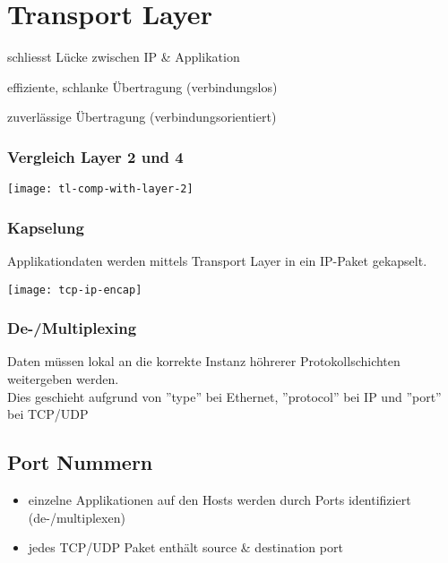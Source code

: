 \section{Transport Layer}

\begin{description}
    \item schliesst Lücke zwischen IP \& Applikation
    \item[UDP] effiziente, schlanke Übertragung (verbindungslos)
    \item[TCP] zuverlässige Übertragung (verbindungsorientiert)
\end{description}

\subsubsection{Vergleich Layer 2 und 4}
\begin{center}
    \texttt{[image: tl-comp-with-layer-2]}
\end{center}

\subsubsection{Kapselung}

Applikationdaten werden mittels Transport Layer in ein IP-Paket gekapselt.

\texttt{[image: tcp-ip-encap]}



\subsubsection{De-/Multiplexing}

Daten müssen lokal an die korrekte Instanz höhrerer Protokollschichten
weitergeben werden. \\

Dies geschieht aufgrund von ''type'' bei Ethernet, ''protocol'' bei IP
und ''port'' bei TCP/UDP



\subsection{Port Nummern}

\begin{itemize}
    \item einzelne Applikationen auf den Hosts werden durch Ports identifiziert
          (de-/multiplexen)
    \item jedes TCP/UDP Paket enthält source \& destination port
\end{itemize}

